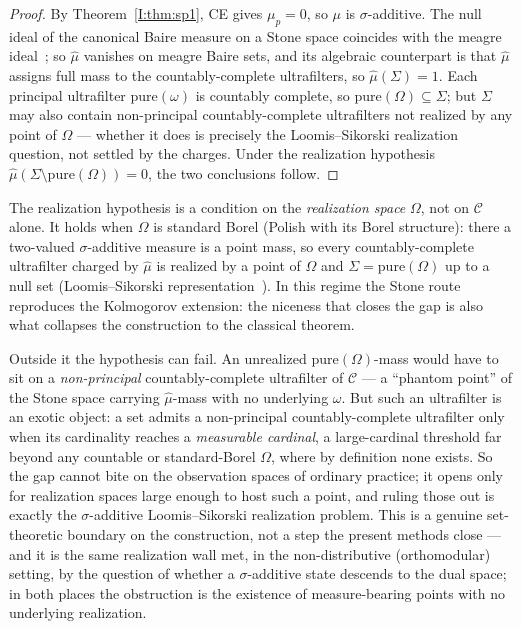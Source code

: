 \begin{proof}
By Theorem~\ref{I:thm:sp1}, CE gives $\mu_p = 0$, so $\mu$ is
$\sigma$-additive.  The null ideal of the canonical Baire measure on a
Stone space coincides with the meagre ideal~\cite[\S321K, \S314M]{Fremlin3};
so $\hat\mu$ vanishes on meagre Baire sets, and its algebraic
counterpart is that $\hat{\mu}$ assigns full mass to the
countably-complete ultrafilters, so $\hat{\mu}(\Sigma) = 1$.  Each
principal ultrafilter $\mathrm{pure}(\omega)$ is countably complete, so
$\mathrm{pure}(\Omega) \subseteq \Sigma$; but $\Sigma$ may also contain
non-principal countably-complete ultrafilters not realized by any point
of $\Omega$ --- whether it does is precisely the Loomis--Sikorski
realization question, not settled by the charges.  Under the realization
hypothesis $\hat{\mu}(\Sigma \setminus \mathrm{pure}(\Omega)) = 0$, the
two conclusions follow.
\end{proof}

\noindent
The realization hypothesis is a condition on the \emph{realization space}
$\Omega$, not on $\mathcal{C}$ alone.  It holds when $\Omega$ is standard
Borel (Polish with its Borel structure): there a two-valued
$\sigma$-additive measure is a point mass, so every countably-complete
ultrafilter charged by $\hat\mu$ is realized by a point of $\Omega$ and
$\Sigma = \mathrm{pure}(\Omega)$ up to a null set (Loomis--Sikorski
representation~\cite{Halmos1950}).  In this regime the Stone route
reproduces the Kolmogorov extension: the niceness that closes the gap is
also what collapses the construction to the classical theorem.

Outside it the hypothesis can fail.  An unrealized
$\mathrm{pure}(\Omega)$-mass would have to sit on a \emph{non-principal}
countably-complete ultrafilter of $\mathcal{C}$ --- a ``phantom point''
of the Stone space carrying $\hat\mu$-mass with no underlying $\omega$.
But such an ultrafilter is an exotic object: a set admits a non-principal
countably-complete ultrafilter only when its cardinality reaches a
\emph{measurable cardinal}, a large-cardinal threshold far beyond any
countable or standard-Borel $\Omega$, where by definition none exists.
So the gap cannot bite on the observation spaces of ordinary practice; it
opens only for realization spaces large enough to host such a point, and
ruling those out is exactly the $\sigma$-additive Loomis--Sikorski
realization problem.  This is a genuine set-theoretic boundary on the
construction, not a step the present methods close --- and it is the same
realization wall met, in the non-distributive (orthomodular) setting, by
the question of whether a $\sigma$-additive state descends to the dual
space; in both places the obstruction is the existence of measure-bearing
points with no underlying realization.

